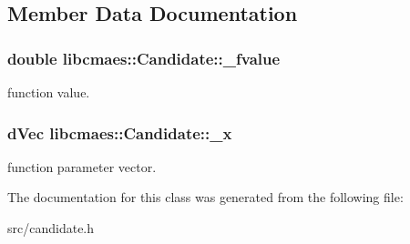 \subsection{Member Data Documentation}
\hypertarget{classlibcmaes_1_1Candidate_af8797627514ae7e137317337372fb67d}{
\subsubsection[{\-\_\-fvalue}]{\setlength{\rightskip}{0pt plus 5cm}double libcmaes\-::\-Candidate\-::\-\_\-fvalue}}\label{classlibcmaes_1_1Candidate_af8797627514ae7e137317337372fb67d}
function value. \hypertarget{classlibcmaes_1_1Candidate_a0cded1d38ec7288e8064414c78023fe4}{
\subsubsection[{\-\_\-x}]{\setlength{\rightskip}{0pt plus 5cm}d\-Vec libcmaes\-::\-Candidate\-::\-\_\-x}}\label{classlibcmaes_1_1Candidate_a0cded1d38ec7288e8064414c78023fe4}
function parameter vector. 

The documentation for this class was generated from the following file\-:\begin{DoxyCompactItemize}
\item 
src/candidate.\-h\end{DoxyCompactItemize}
